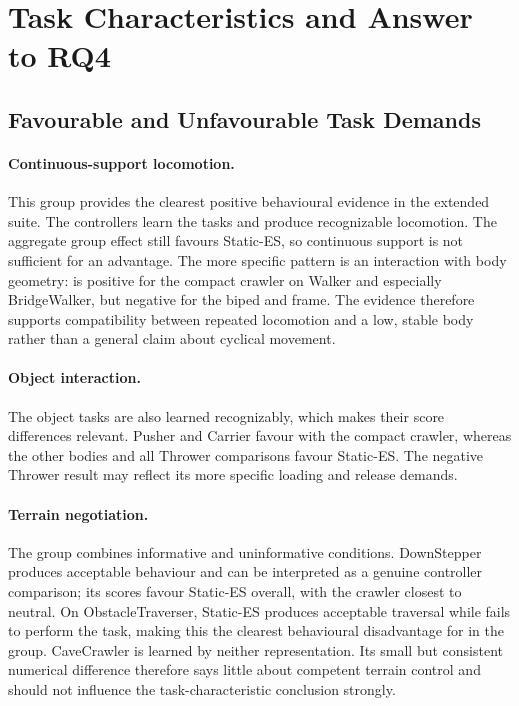 \section{Task Characteristics and Answer to RQ4}
\label{sec:extended-interpretation}

\subsection{Favourable and Unfavourable Task Demands}

\paragraph{Continuous-support locomotion.}
This group provides the clearest positive behavioural evidence in the extended suite. The controllers learn the tasks and produce recognizable locomotion. The aggregate group effect still favours Static-ES, so continuous support is not sufficient for an \nchl{} advantage. The more specific pattern is an interaction with body geometry: \nchl{} is positive for the compact crawler on Walker and especially BridgeWalker, but negative for the biped and frame. The evidence therefore supports compatibility between repeated locomotion and a low, stable body rather than a general claim about cyclical movement.

\paragraph{Object interaction.}
The object tasks are also learned recognizably, which makes their score differences relevant. Pusher and Carrier favour \nchl{} with the compact crawler, whereas the other bodies and all Thrower comparisons favour Static-ES. The negative Thrower result may reflect its more specific loading and release demands.

\paragraph{Terrain negotiation.}
The group combines informative and uninformative conditions. DownStepper produces acceptable behaviour and can be interpreted as a genuine controller comparison; its scores favour Static-ES overall, with the crawler closest to neutral. On ObstacleTraverser, Static-ES produces acceptable traversal while \nchl{} fails to perform the task, making this the clearest behavioural disadvantage for \nchl{} in the group. CaveCrawler is learned by neither representation. Its small but consistent numerical difference therefore says little about competent terrain control and should not influence the task-characteristic conclusion strongly.


